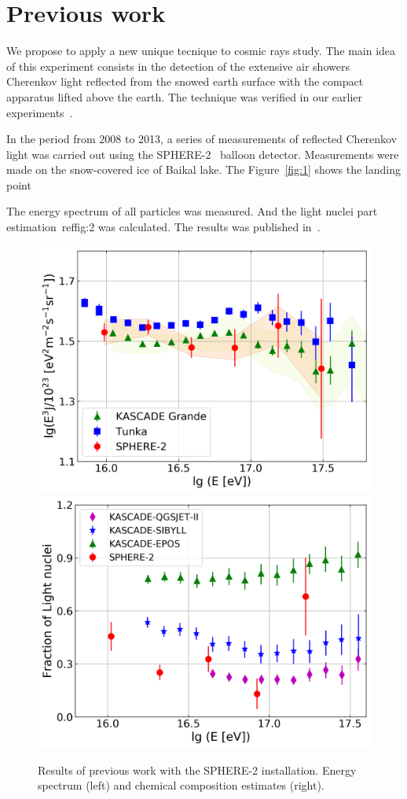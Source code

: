 \documentclass[a4paper,11pt]{article}
\begin{document}
\section{Previous work}

We propose to apply a new unique tecnique to cosmic rays study. The main idea of this experiment consists in the detection of the extensive air showers Cherenkov light reflected from the snowed earth surface with the compact apparatus lifted above the earth. The technique was verified in our earlier experiments~\cite{1,2}.

In the period from 2008 to 2013, a series of measurements of reflected Cherenkov light was carried out using the SPHERE-2~\cite{1,2,3} balloon detector. Measurements were made on the snow-covered ice of Baikal lake. The Figure~\ref{fig:1} shows the landing point

The energy spectrum of all particles was measured. And the light nuclei part estimation~ref{fig:2} was calculated. The results was published in~\cite{2}. 

\begin{figure}[htbp]
\centering %
\includegraphics[width=.4\textwidth,trim=0 0 0 0,clip]{sphere2spectrum.png}
\qquad
\includegraphics[width=.4\textwidth,origin=c,angle=0]{sphere2composition.png}
\caption{\label{fig:2} Results of previous work with the SPHERE-2 installation. Energy spectrum (left) and chemical composition estimates (right).}
\end{figure}
\end{document}
